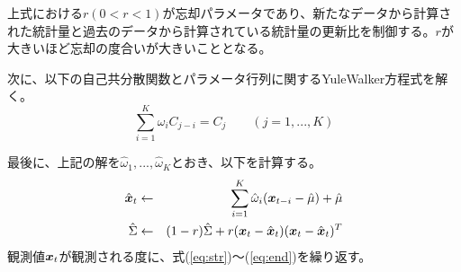 上式における$r(0<r<1)$が忘却パラメータであり、新たなデータから計算された統計量と過去のデータから計算されている統計量の更新比を制御する。$r$が大きいほど忘却の度合いが大きいこととなる。

次に、以下の自己共分散関数とパラメータ行列に関するYuleWalker方程式を解く\cite{kit}。
\begin{equation}
\sum_{i=1}^{K}{\omega_i}C_{j-i}=C_j\qquad(j=1,...,K)
\end{equation}

最後に、上記の解を$\hat{\omega}_1,...,\hat{\omega}_K$とおき、以下を計算する。
\begin{eqnarray}
\hat{\mbox{\boldmath $x$}}_t&\leftarrow&\sum_{i=1}^{K}{\hat{\omega}_i(\mbox{\boldmath $x$}_{t-i}-\hat{\mu})+\hat{\mu}}\\
\hat{\Sigma}&\leftarrow&(1-r)\hat{\Sigma}+r(\mbox{\boldmath $x$}_t-\hat{\mbox{\boldmath $x$}}_t)(\mbox{\boldmath $x$}_t-\hat{\mbox{\boldmath $x$}}_t)^T
\label{eq:end}
\end{eqnarray}
観測値$\mbox{\boldmath $x$}_t$が観測される度に、式(\ref{eq:str})～(\ref{eq:end})を繰り返す。


